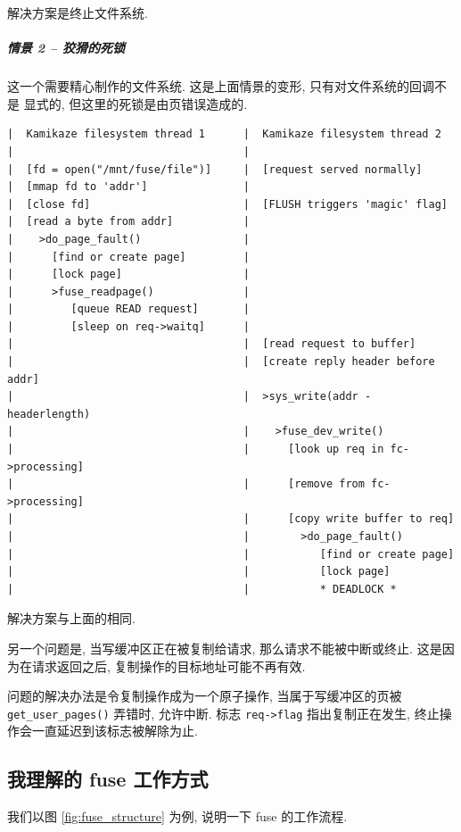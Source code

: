 \documentclass[nofonts]{ctexart}
\begin{document}
解决方案是终止文件系统.

\subparagraph{情景 2 --
狡猾的死锁}\label{ux60c5ux666f-2-ux72e1ux733eux7684ux6b7bux9501}

这一个需要精心制作的文件系统. 这是上面情景的变形,
只有对文件系统的回调不是 显式的, 但这里的死锁是由页错误造成的.

\begin{verbatim}
|  Kamikaze filesystem thread 1      |  Kamikaze filesystem thread 2
|                                    |
|  [fd = open("/mnt/fuse/file")]     |  [request served normally]
|  [mmap fd to 'addr']               |
|  [close fd]                        |  [FLUSH triggers 'magic' flag]
|  [read a byte from addr]           |
|    >do_page_fault()                |
|      [find or create page]         |
|      [lock page]                   |
|      >fuse_readpage()              |
|         [queue READ request]       |
|         [sleep on req->waitq]      |
|                                    |  [read request to buffer]
|                                    |  [create reply header before addr]
|                                    |  >sys_write(addr - headerlength)
|                                    |    >fuse_dev_write()
|                                    |      [look up req in fc->processing]
|                                    |      [remove from fc->processing]
|                                    |      [copy write buffer to req]
|                                    |        >do_page_fault()
|                                    |           [find or create page]
|                                    |           [lock page]
|                                    |           * DEADLOCK *
\end{verbatim}

解决方案与上面的相同.

另一个问题是, 当写缓冲区正在被复制给请求, 那么请求不能被中断或终止.
这是因 为在请求返回之后, 复制操作的目标地址可能不再有效.

问题的解决办法是令复制操作成为一个原子操作, 当属于写缓冲区的页被
\texttt{get\_user\_pages()} 弄错时, 允许中断. 标志
\texttt{req-\textgreater{}flag} 指出复制正在发生,
终止操作会一直延迟到该标志被解除为止.

\subsection{我理解的 fuse
工作方式}\label{ux6211ux7406ux89e3ux7684-fuse-ux5de5ux4f5cux65b9ux5f0f}

我们以图 \ref{fig:fuse_structure} 为例, 说明一下 fuse 的工作流程.
\end{document}
